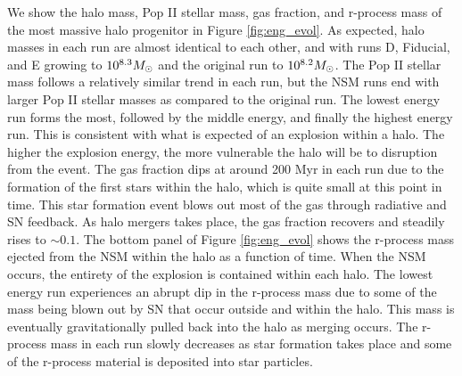 \documentclass[fleqn,usenatbib]{mnras}
\begin{document}
We show the halo mass, Pop II stellar mass, gas fraction, and r-process mass of the most massive halo progenitor in Figure \ref{fig:eng_evol}. As expected, halo masses in each run are almost identical to each other, and with runs D, Fiducial, and E growing to $10^{8.3} \Ms$ and the original run to $10^{8.2} \Ms$. The Pop II stellar mass follows a relatively similar trend in each run, but the NSM runs end with larger Pop II stellar masses as compared to the original run. The lowest energy run forms the most, followed by the middle energy, and finally the highest energy run. This is consistent with what is expected of an explosion within a halo. The higher the explosion energy, the more vulnerable the halo will be to disruption from the event. The gas fraction dips at around 200 Myr in each run due to the formation of the first stars within the halo, which is quite small at this point in time. This star formation event blows out most of the gas through radiative and SN feedback. As halo mergers takes place, the gas fraction recovers and steadily rises to $\sim 0.1$. The bottom panel of Figure \ref{fig:eng_evol} shows the r-process mass ejected from the NSM within the halo as a function of time. When the NSM occurs, the entirety of the explosion is contained within each halo. The lowest energy run experiences an abrupt dip in the r-process mass due to some of the mass being blown out by SN that occur outside and within the halo. This mass is eventually gravitationally pulled back into the halo as merging occurs. The r-process mass in each run slowly decreases as star formation takes place and some of the r-process material is deposited into star particles. 
\end{document}

